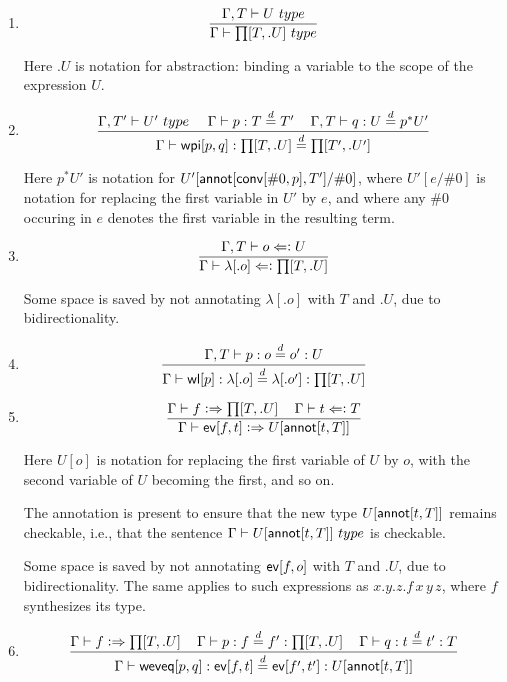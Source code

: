 \documentclass[11pt]{article}
\newcommand{\eqd}{\stackrel{d}{=}}
\newcommand{\spc}{{\,\,\,\,\,\,\,}}
\newcommand{\synth}{\vcentcolon\Rightarrow}
\newcommand{\force}{\Leftarrow\vcentcolon}
\newcommand{\Type}{\mathop{{\, \sc type}}}
\newcommand{\ha}[2]{#1[#2]}
\newcommand{\annot}{{\sf annot}}
\newcommand{\conv}{{\sf conv}}
\newcommand{\ev}{{\sf ev}}
\newcommand{\weveq}{{\sf weveq}}
\newcommand{\wl}{{\sf wl}}
\newcommand{\wpi}{{\sf wpi}}
\begin{document}
\begin{enumerate}

\item 
$$\frac{\Gamma, T\vdash U\Type}{\Gamma\vdash \ha\prod{T,.U}\Type}$$

Here $.U$ is notation for abstraction: binding a variable to the scope of the expression $U$.

\item 
$$ \frac{ 
  \Gamma, T' \vdash U'  \Type      \spc 
  \Gamma     \vdash p:T \eqd T'    \spc
  \Gamma, T  \vdash q:U \eqd p^*U'
  } {
  \Gamma     \vdash \ha\wpi{p,q}:\ha\prod{T,.U}\eqd \ha\prod{T',.U'}
}$$

Here ${p}^*U'$ is notation for $U'[\ha\annot{\ha\conv{\#0,p},T'}/\#0]$, where
$U'[e/\#0]$ is notation for replacing the first variable in $U'$ by $e$, and
where any $\#0$ occuring in $e$ denotes the first variable in the resulting
term.

\item 
$$\frac{\Gamma, T\vdash o \force U}{\Gamma\vdash \ha\lambda{.o} \force \ha\prod{T,.U}}$$

Some space is saved by not annotating $\ha\lambda{.o}$ with $T$ and $.U$, due to bidirectionality.

\item 
$$\frac{\Gamma, T\vdash p : o\eqd o' : U}{\Gamma\vdash \ha\wl{p} : \ha\lambda{.o}\eqd \ha\lambda{.o'} : \ha\prod{T,.U}}$$

\item 
$$\frac{\Gamma\vdash f \synth \ha\prod{T,.U}\spc \Gamma\vdash t \force T}{\Gamma\vdash \ha\ev{f,t} \synth U[\ha\annot{t,T}]}$$

Here $U[o]$ is notation for replacing the first variable of $U$ by $o$, with
the second variable of $U$ becoming the first, and so on.  

The annotation is present to ensure that the new type $U[\ha\annot{t,T}]$
remains checkable, i.e., that the sentence $\Gamma \vdash U[\ha\annot{t,T}]
\Type$ is checkable.

Some space is saved by not annotating $\ha\ev{f,o}$ with $T$ and $.U$, due to
bidirectionality.  The same applies to such expressions as $x.y.z.f\, x\, y\,
z$, where $f$ synthesizes its type.

\item 
$$\frac{\Gamma\vdash f \synth \ha\prod{T,.U} \spc \Gamma\vdash p : f \eqd
  f' : \ha\prod{T,.U}\spc \Gamma\vdash q : t \eqd t' : T}{\Gamma\vdash
  \ha\weveq{p,q} : \ha\ev{f,t} \eqd \ha\ev{f',t'} : U[\ha\annot{t,T}]}$$


\end{enumerate}
\end{document}
